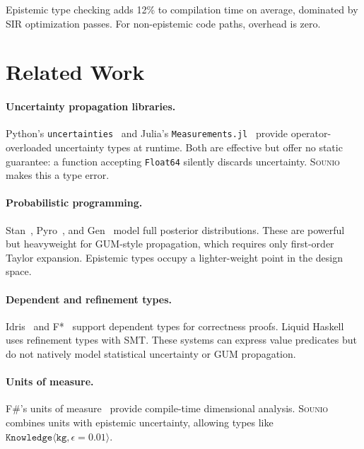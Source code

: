 \documentclass[acmsmall,screen,review,anonymous]{acmart}
\newcommand{\sounio}{\textsc{Sounio}\xspace}
\newcommand{\know}[1]{\texttt{Knowledge}\langle #1 \rangle}
\newcommand{\eps}{\epsilon}
\begin{document}
Epistemic type checking adds 12\% to compilation time on average,
dominated by SIR optimization passes.
For non-epistemic code paths, overhead is zero.

\section{Related Work}
\label{sec:related}

\paragraph{Uncertainty propagation libraries.}
Python's \texttt{uncertainties}~\cite{lebigot2024uncertainties} and
Julia's \texttt{Measurements.jl}~\cite{giordano2016measurements} provide
operator-overloaded uncertainty types at runtime.
Both are effective but offer no static guarantee: a function
accepting \texttt{Float64} silently discards uncertainty.
\sounio makes this a type error.

\paragraph{Probabilistic programming.}
Stan~\cite{carpenter2017stan}, Pyro~\cite{bingham2019pyro}, and
Gen~\cite{cusumano2019gen} model full posterior distributions.
These are powerful but heavyweight for GUM-style propagation,
which requires only first-order Taylor expansion.
Epistemic types occupy a lighter-weight point in the design space.

\paragraph{Dependent and refinement types.}
Idris~\cite{brady2013idris} and F*~\cite{swamy2016dependent} support
dependent types for correctness proofs.
Liquid Haskell uses refinement types with SMT.
These systems can express value predicates but do not natively model
statistical uncertainty or GUM propagation.

\paragraph{Units of measure.}
F\#'s units of measure~\cite{kennedy2009units} provide compile-time
dimensional analysis.
\sounio combines units with epistemic uncertainty, allowing types
like $\know{\texttt{kg}, \eps=0.01}$.
\end{document}
